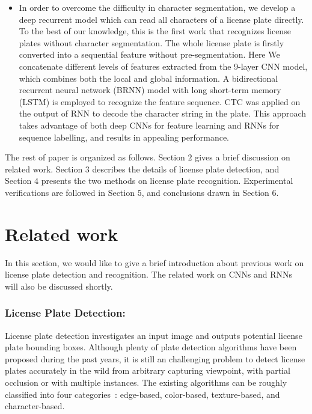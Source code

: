 \documentclass[twocolumn]{svjour3}
\begin{document}
\begin{itemize}
\item In order to overcome the difficulty in character segmentation, we develop a deep recurrent model which can read all characters of a license plate directly. To the best of our knowledge, this is the first work that recognizes license plates without character segmentation. The whole license plate is firstly converted into a sequential feature without pre-segmentation. Here We concatenate different levels of features extracted from the $9$-layer CNN model, which combines both the local and global information.
    A bi\-di\-rectional recurrent neural network
    (BRNN) model with long short-term memory (LSTM) is employed to recognize the feature sequence. CTC was applied on the output of RNN to decode the character string in the plate. This approach takes advantage of both deep CNNs for feature learning and RNNs for sequence labelling, and results in appealing performance.




\end{itemize}

The rest of paper is organized as follows. Section $2$ gives a brief discussion on related work. Section $3$ describes the details of license plate detection, and Section $4$ presents the two methods on license plate recognition. Experimental verifications are followed in Section $5$, and conclusions drawn in Section $6$.

\section{Related work}\label{sec:ReWork}%
In this section, we would like to give a brief introduction about previous work on license plate detection and recognition. The related work on CNNs and RNNs will also be discussed shortly.

\subsubsection{License Plate Detection:} License plate detection investigates an input image and outputs potential license plate bounding boxes. Although plenty of plate detection algorithms have been proposed during the past years, it is still an challenging problem to detect license plates accurately in the wild from arbitrary capturing viewpoint, with partial occlusion or with multiple instances. The existing algorithms can be roughly classified into four categories~\cite{Du2013Automatic,Zhou2012Principal,Anagnostopoulos}: edge-based,  color-based, texture-based, and character-based.
\end{document}
